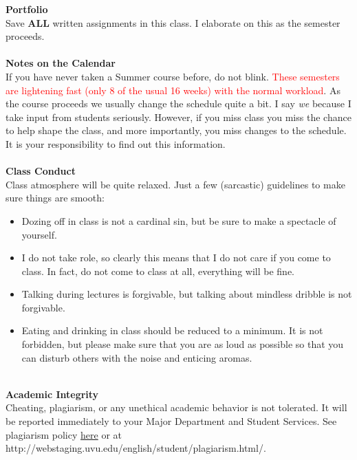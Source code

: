 \documentclass [11pt]{article}
\begin{document}
 {\bf Portfolio}\\
   Save {\bf ALL} written assignments in this class. I elaborate on this as the semester proceeds. \\
   \ \\ 

   {\bf Notes on the Calendar}\\
   If you have never taken a Summer course before, do not blink. \textcolor{red}{These semesters are lightening fast (only 8 of the usual 16 weeks) with the normal workload}. As the course proceeds we usually change the schedule quite a bit. I say {\it we} because I take input from students seriously. However, if you miss class you miss the chance to help shape the class, and more importantly, you miss changes to the schedule. It is your responsibility to find out this information. \\
   \ \\  

   {\bf Class Conduct}\\
   Class atmosphere will be quite relaxed. Just a few (sarcastic) guidelines to make sure things are smooth:
   \begin{itemize}
   \item  Dozing off in class is not a cardinal sin, but be sure to make a spectacle of yourself.
   \item I do not take role, so clearly this means that I do not care if you come to class. In fact, do not come to class at all, everything will be fine.
    \item Talking during lectures is forgivable, but talking about mindless dribble is not forgivable.
     \item  Eating and drinking in class should be reduced to a minimum. It is not forbidden, but please make sure that you are as loud as possible so that you can disturb others with the noise and enticing aromas.
        
    \end{itemize}
   \ \\
       

   {\bf Academic Integrity}\\
 Cheating, plagiarism, or any unethical academic behavior is not tolerated. It will be reported immediately to your Major Department and Student Services. See plagiarism policy \href{http://webstaging.uvu.edu/english/student/plagiarism.html/}{here} or at http://webstaging.uvu.edu/english/student/plagiarism.html/.\\
   \ \\
  
\end{document}
